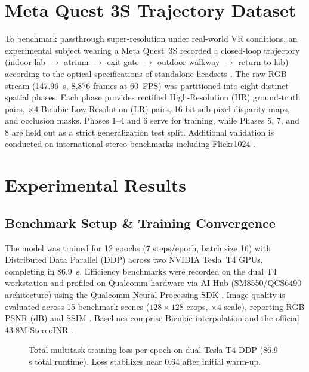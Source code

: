 \documentclass[conference]{IEEEtran}
\begin{document}
\section{Meta Quest 3S Trajectory Dataset}
To benchmark passthrough super-resolution under real-world VR conditions, an experimental subject wearing a Meta Quest~3S recorded a closed-loop trajectory (indoor lab $\to$ atrium $\to$ exit gate $\to$ outdoor walkway $\to$ return to lab) according to the optical specifications of standalone headsets \cite{quest3_optics}. The raw RGB stream (147.96~s, 8{,}876 frames at 60~FPS) was partitioned into eight distinct spatial phases. Each phase provides rectified High-Resolution (HR) ground-truth pairs, $\times 4$ Bicubic Low-Resolution (LR) pairs, 16-bit sub-pixel disparity maps, and occlusion masks. Phases 1--4 and 6 serve for training, while Phases 5, 7, and 8 are held out as a strict generalization test split. Additional validation is conducted on international stereo benchmarks including Flickr1024 \cite{flickr1024}.

\section{Experimental Results}

\subsection{Benchmark Setup \& Training Convergence}
The model was trained for 12 epochs (7 steps/epoch, batch size 16) with Distributed Data Parallel (DDP) across two NVIDIA Tesla~T4 GPUs, completing in 86.9~s. Efficiency benchmarks were recorded on the dual T4 workstation and profiled on Qualcomm hardware via AI Hub (SM8550/QCS6490 architecture) using the Qualcomm Neural Processing SDK \cite{qnn_sdk}. Image quality is evaluated across 15 benchmark scenes ($128 \times 128$ crops, $\times 4$ scale), reporting RGB PSNR (dB) and SSIM \cite{ssim}. Baselines comprise Bicubic interpolation and the official 43.8M StereoINR \cite{stereoinr}.

\begin{figure}[!t]
\centering
{}
\caption{Total multitask training loss per epoch on dual Tesla T4 DDP (86.9\,s total runtime). Loss stabilizes near 0.64 after initial warm-up.}
\label{fig:loss}
\end{figure}
\end{document}
